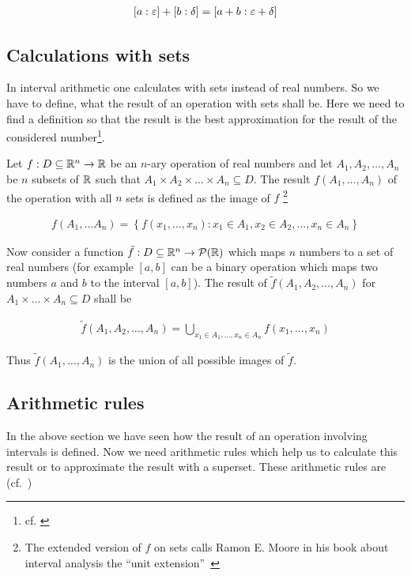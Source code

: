 \begin{align}
  \an{a}+\an[\delta]{b} = \an[\epsilon+\delta]{a+b}
\end{align}

\subsection{Calculations with sets}

In interval arithmetic one calculates with sets instead of real numbers. So we have to define, what the result of an operation with sets shall be. Here we need to find a definition so that the result is the best approximation for the result of the considered number\footnote{cf. \cite[pp. 17-18]{kulla}}.

Let $f:D\subseteq\R^n\to\R$ be an $n$-ary operation of real numbers and let $A_1,A_2,\ldots,A_n$ be $n$ subsets of $\R$ such that $A_1\times A_2\times \dots\times A_n\subseteq D$. The result  $f\left(A_1,\ldots,A_n\right)$ of the operation with all $n$ sets is defined as the image of $f$ \footnote{The extended version of $f$ on sets calls Ramon E. Moore in his book about interval analysis the ``unit extension''~\cite[p. 18]{moore}}

\begin{align}
  f\left(A_1,\ldots A_n\right)=\left\{f(x_1,\ldots,x_n):x_1\in A_1,x_2\in A_2,\ldots,x_n\in A_n\right\}
\end{align}

Now consider a function $\tilde f:D\subseteq\R^n\to \mathcal P(\R)$ which maps $n$ numbers to a set of real numbers (for example $[a,b]$ can be a binary operation which maps two numbers $a$ and $b$ to the interval $[a,b]$). The result of $\tilde f\left(A_1,A_2,\ldots,A_n\right)$ for $A_1\times\dots\times A_n\subseteq D$ shall be

\begin{align}
  \tilde f\left(A_1,A_2,\ldots,A_n\right) = \bigcup_{x_1\in A_1, \ldots, x_n \in A_n} f(x_1,\ldots,x_n)
\end{align}

\noindent Thus $\tilde f(A_1,\ldots,A_n)$ is the union of all possible images of $\tilde f$.

\subsection{Arithmetic rules}

In the above section we have seen how the result of an operation involving intervals is defined. Now we need arithmetic rules which help us to calculate this result or to approximate the result with a superset. These arithmetic rules are (cf.~\cite[pp.~19-24.]{kulla})

